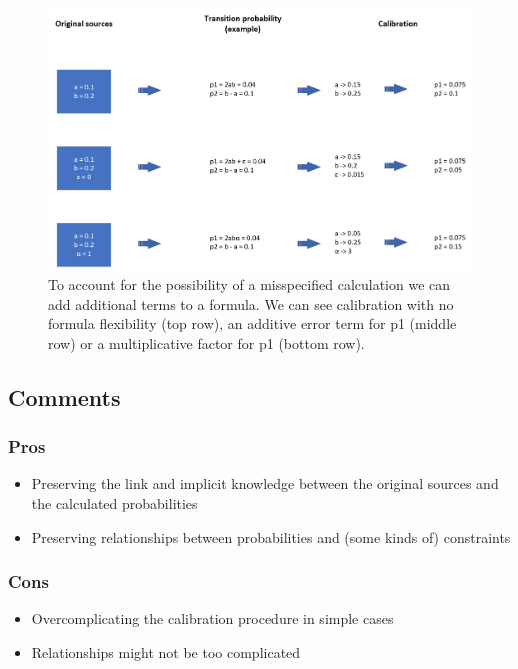 \begin{figure}[h!]
	\centering
	\includegraphics[width=\textwidth]{figures/calibration_calculation}
	\decoRule
	\caption[Calibration over calculations]{To account for the possibility of a misspecified calculation we can add additional terms to a formula. We can see calibration with no formula flexibility (top row), an additive error term for p1 (middle row) or a multiplicative factor for p1 (bottom row).}
	\label{fig:calibration_calculation}
\end{figure}

\subsection{Comments}

\subsubsection*{Pros}
\begin{itemize}
	\item Preserving the link and implicit knowledge between the original sources and the calculated probabilities
	\item Preserving relationships between probabilities and (some kinds of) constraints
\end{itemize}

\subsubsection*{Cons}
\begin{itemize}
	\item Overcomplicating the calibration procedure in simple cases
	\item Relationships might not be too complicated
\end{itemize}

